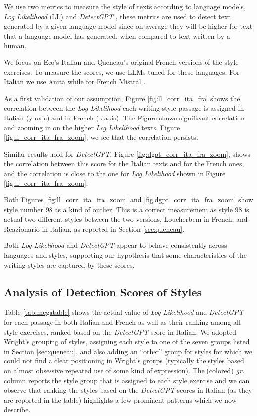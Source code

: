 \documentclass[
twocolumn,
]{ceurart}
\begin{document}
We use two metrics to measure the style of texts according to language models, \emph{Log Likelihood} (LL) and \emph{DetectGPT} \citep{mitchell_detectgpt_2023}, these metrics are used to detect text generated by a given language model since on average they will be higher for text that a language model has generated, when compared to text written by a human.

We focus on Eco's Italian and Queneau's original French versions of the style exercises. 
To measure the scores, we use LLMs tuned for these languages. 
For Italian we use Anita \cite{polignano2024advancednaturalbasedinteractionitalian} while for French Mistral \cite{jiang2023mistral}. 

As a first validation of our assumption, Figure \ref{fig:ll_corr_ita_fra} shows the correlation between the \emph{Log Likelihood} each writing style passage is assigned in Italian (y-axis) and in French (x-axis). The Figure shows significant correlation and zooming in on the higher \emph{Log Likelihood} texts, Figure \ref{fig:ll_corr_ita_fra_zoom}, we see that the correlation persists.

Similar results hold for \emph{DetectGPT}, Figure \ref{fig:dgpt_corr_ita_fra_zoom}, shows the correlation between this score for the Italian texts and for the French ones, and the correlation is close to the one for \emph{Log Likelihood} shown in Figure \ref{fig:ll_corr_ita_fra_zoom}.

Both Figures \ref{fig:ll_corr_ita_fra_zoom} and \ref{fig:dgpt_corr_ita_fra_zoom} show style number 98 as a kind of outlier.
This is a correct measurement as style 98 is actual two different styles between the two versions, Loucherbem in French, and Reazionario in Italian, as reported in Section \ref{sec:queneau}.

Both \emph{Log Likelihood} and \emph{DetectGPT} appear to behave consistently across languages and styles, supporting our hypothesis that some characteristics of the writing styles are captured by these scores. 

\subsection{Analysis of Detection Scores of Styles}

Table \ref{tab:megatable} shows the actual value of \emph{Log Likelihood} and \emph{DetectGPT} for each passage in both Italian and French as well as their ranking among all style exercises, ranked based on the \emph{DetectGPT} score in Italian.
We adopted Wright's grouping of styles, assigning each style to one of the seven groups listed in Section \ref{sec:queneau}, and also adding an ``other'' group for styles for which we could not find a clear positioning in Wright's groups (typically the styles based on almost obsessive repeated use of some kind of expression).
The (colored) \emph{gr.} column reports the style group that is assigned to each style exercise and we can observe that ranking the styles based on the \emph{DetectGPT} scores in Italian (as they are reported in the table) highlights a few prominent patterns which we now describe.
\end{document}
